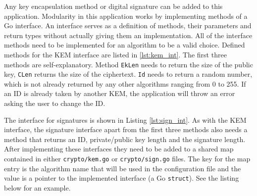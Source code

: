 Any key encapsulation method or digital signature can be added to this application. Modularity in this application works by implementing methods of a Go interface. An interface serves as a definition of methods, their parameters and return types without actually giving them an implementation. All of the interface methods need to be implemented for an algorithm to be a valid choice. Defined methods for the KEM interface are listed in \ref{lst:kem_int}. The first three methods are self-explanatory. Method \texttt{EkLen} needs to return the size of the public key, \texttt{CLen} returns the size of the ciphertext. \texttt{Id} needs to return a random number, which is not already returned by any other algorithms ranging from 0 to 255. If an ID is already taken by another KEM, the application will throw an error asking the user to change the ID.

The interface for signatures is shown in Listing \ref{lst:sign_int}. As with the KEM interface, the signature interface apart from the first three methods also needs a method that returns an ID, private/public key length and the signature length. After implementing these interfaces they need to be added to a shared map contained in either \texttt{crypto/kem.go} or \texttt{crypto/sign.go} files. The key for the map entry is the algorithm name that will be used in the configuration file and the value is a pointer to the implemented interface (a Go \texttt{struct}). See the listing below for an example.

